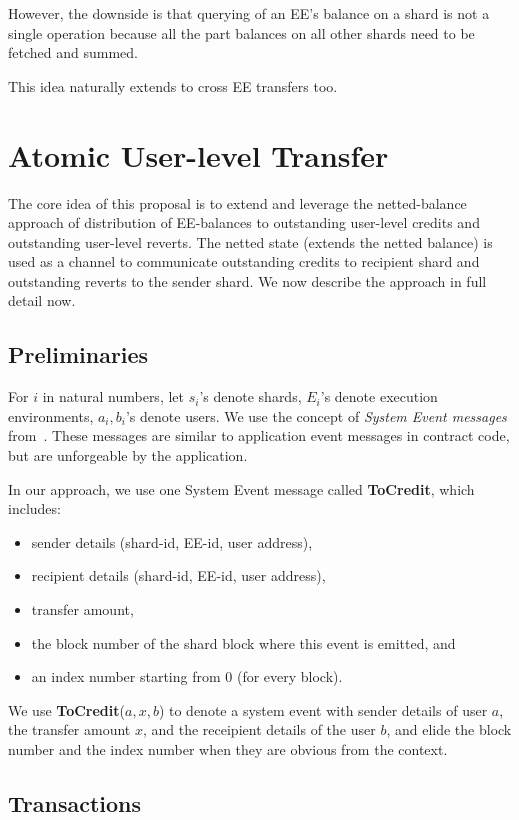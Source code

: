 \documentclass{article}
\newcommand{\tocredit}[0]{{\bf ToCredit}}
\begin{document}
However, the downside is that querying of an EE's balance on a shard is not a single operation because all the part balances on all other shards need to be fetched and summed. 

This idea naturally extends to cross EE transfers too.

\section{Atomic User-level Transfer}
\label{sec:atomic-user}
The core idea of this proposal is to extend and leverage the netted-balance approach of distribution of EE-balances to outstanding user-level credits and outstanding user-level reverts. The netted state (extends the netted balance) is used as a channel to communicate outstanding credits to recipient shard and outstanding reverts to the sender shard. We now describe the approach in full detail now.

\subsection{Preliminaries}

For $i$ in natural numbers, let
$s_i$'s denote shards, 
$E_i$'s denote execution environments,
$a_i, b_i$'s denote users.
We use the concept of {\em System Event messages} from~\cite{peter-cross-shard}. These messages are similar to application event messages in contract code, but are unforgeable by the application. 

In our approach, we use one System Event message called \tocredit, which includes:
\begin{itemize}
\item sender details (shard-id, EE-id, user address), 
\item recipient details (shard-id, EE-id, user address), 
\item transfer amount, 
\item the block number of the shard block where this event is emitted, and 
\item an index number starting from 0 (for every block).
\end{itemize}
We use \tocredit($a,x,b$) to denote a system event with sender details of user $a$, the transfer amount $x$, and the receipient details of the user $b$, and elide the block number and the index number when they are obvious from the context.

\subsection{Transactions}
\end{document}
